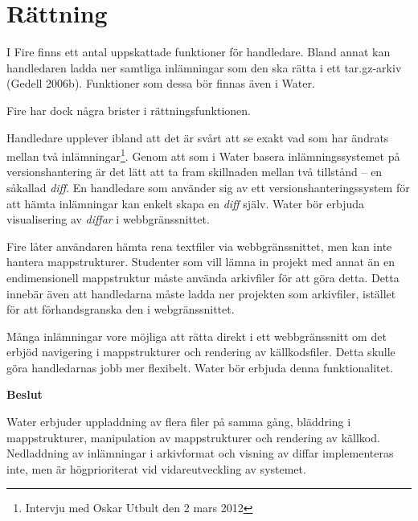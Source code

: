\section{Rättning}

I Fire finns ett antal uppskattade funktioner för handledare. Bland annat kan handledaren ladda ner samtliga inlämningar som den ska rätta i ett tar.gz-arkiv (Gedell 2006b). Funktioner som dessa bör finnas även i Water.

Fire har dock några brister i rättningsfunktionen.

Handledare upplever ibland att det är svårt att se exakt vad som har ändrats mellan två inlämningar\footnote{Intervju med Oskar Utbult den 2 mars 2012}. Genom att som i Water basera inlämningssystemet på versionshantering är det lätt att ta fram skillnaden mellan två tillstånd – en såkallad \emph{diff}. En handledare som använder sig av ett versionshanteringssystem för att hämta inlämningar kan enkelt skapa en \emph{diff} själv. Water bör erbjuda visualisering av \emph{diffar} i webbgränssnittet.

Fire låter användaren hämta rena textfiler via webbgränssnittet, men kan inte hantera mappstrukturer. Studenter som vill lämna in projekt med annat än en endimensionell mappstruktur måste använda arkivfiler för att göra detta. Detta innebär även att handledarna måste ladda ner projekten som arkivfiler, istället för att förhandsgranska den i webgränssnittet.

Många inlämningar vore möjliga att rätta direkt i ett webbgränssnitt om det erbjöd navigering i mappstrukturer och rendering av källkodsfiler. Detta skulle göra handledarnas jobb mer flexibelt. Water bör erbjuda denna funktionalitet.

\begin{flushright}
  
  \textbf{Beslut}
  
  Water erbjuder uppladdning av flera filer på samma gång, bläddring i mappstrukturer, manipulation av mappstrukturer och rendering av källkod. Nedladdning av inlämningar i arkivformat och visning av diffar implementeras inte, men är högprioriterat vid vidareutveckling av systemet.
  
\end{flushright}